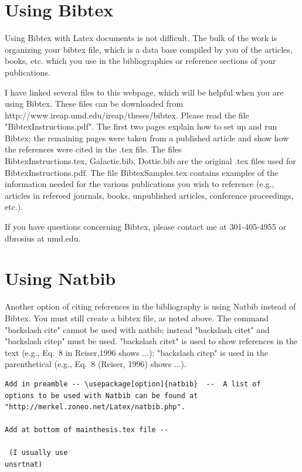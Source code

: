 \section{Using Bibtex}

Using Bibtex with Latex documents is not difficult.  The bulk of the work is organizing your bibtex file, which is a data base compiled by you of the articles, books, etc. which you use in the bibliographies or reference sections of your publications.

I have linked several files to this webpage, which will be helpful
when you are using Bibtex.  These files can be downloaded from
\newline http://www.ireap.umd.edu/ireap/theses/bibtex.  Please
read the file "BibtexInstructions.pdf".  The first two pages
explain how to set up and run Bibtex; the remaining pages were
taken from a published article and show how the references were
cited in the .tex file.   The files \\ BibtexInstructions.tex,
Galactic.bib, Dottie.bib are the original .tex files used for \\
BibtexInstructions.pdf.  The file  BibtexSamples.tex contains
examples of the information needed for the various publications
you wish to reference (e.g., articles in refereed journals, books,
unpublished articles, conference proceedings, etc.).

If you have questions concerning Bibtex, please contact me at 301-405-4955 or dbrosius at umd.edu.

\section{Using Natbib}

Another option of citing references in the bibliography is using
Natbib instead of Bibtex.  You must still create a bibtex file, as
noted above.  The command "backslash cite" cannot be used with
natbib; instead "backslash citet" and "backslash citep" must be
used. "backslash citet" is used to show references in the text
(e.g., Eq.\ 8 in Reiser,1996 shows ...); "backslash citep" is used
in the parenthetical (e.g., Eq.\ 8 (Reiser, 1996) shows ...).

\begin{verbatim}
Add in preamble -- \usepackage[option]{natbib}  --  A list of
options to be used with Natbib can be found at
"http://merkel.zoneo.net/Latex/natbib.php".

Add at bottom of mainthesis.tex file --

 (I usually use
unsrtnat)

\end{verbatim}

